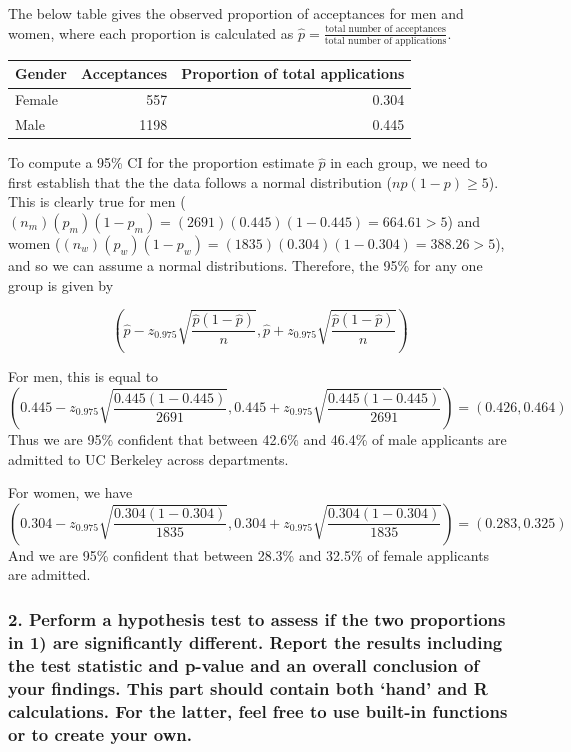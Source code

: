 \documentclass[]{article}
\begin{document}
The below table gives the observed proportion of acceptances for men and
women, where each proportion is calculated as
\(\hat{p} = \frac{\text{total number of acceptances}}{\text{total number of applications}}\).

\begin{longtable}[]{@{}lrr@{}}
\toprule
Gender & Acceptances & Proportion of total applications\tabularnewline
\midrule
\endhead
Female & 557 & 0.304\tabularnewline
Male & 1198 & 0.445\tabularnewline
\bottomrule
\end{longtable}

To compute a 95\% CI for the proportion estimate \(\hat{p}\) in each
group, we need to first establish that the the data follows a normal
distribution (\(np(1-p) \geq 5\)). This is clearly true for men
(\((n_m)(p_m)(1-p_m) = (2691)(0.445)(1-0.445) = 664.61 > 5\)) and women
(\((n_w)(p_w)(1-p_w) = (1835)(0.304)(1-0.304) = 388.26 > 5\)), and so we
can assume a normal distributions. Therefore, the 95\% for any one group
is given by

\[(\hat{p} - z_{0.975}\sqrt{\frac{\hat{p}(1-\hat{p})}{n}}, \hat{p} + z_{0.975}\sqrt{\frac{\hat{p}(1-\hat{p})}{n}})\]

For men, this is equal to
\[(0.445 - z_{0.975}\sqrt{\frac{0.445(1-0.445)}{2691}}, 0.445 + z_{0.975}\sqrt{\frac{0.445(1-0.445)}{2691}}) = (0.426, 0.464)\]
Thus we are 95\% confident that between 42.6\% and 46.4\% of male
applicants are admitted to UC Berkeley across departments.

For women, we have
\[(0.304 - z_{0.975}\sqrt{\frac{0.304(1-0.304)}{1835}}, 0.304 + z_{0.975}\sqrt{\frac{0.304(1-0.304)}{1835}}) = (0.283, 0.325)\]
And we are 95\% confident that between 28.3\% and 32.5\% of female
applicants are admitted.

\subsubsection{\texorpdfstring{2. Perform a hypothesis test to assess if
the two proportions in 1) are significantly different. Report the
results including the test statistic and p-value and an overall
conclusion of your findings. This part should contain both `hand' and R
calculations. For the latter, feel free to use built-in functions or to
create your
own.}{2. Perform a hypothesis test to assess if the two proportions in 1) are significantly different. Report the results including the test statistic and p-value and an overall conclusion of your findings. This part should contain both hand and R calculations. For the latter, feel free to use built-in functions or to create your own.}}\label{perform-a-hypothesis-test-to-assess-if-the-two-proportions-in-1-are-significantly-different.-report-the-results-including-the-test-statistic-and-p-value-and-an-overall-conclusion-of-your-findings.-this-part-should-contain-both-hand-and-r-calculations.-for-the-latter-feel-free-to-use-built-in-functions-or-to-create-your-own.}
\end{document}
